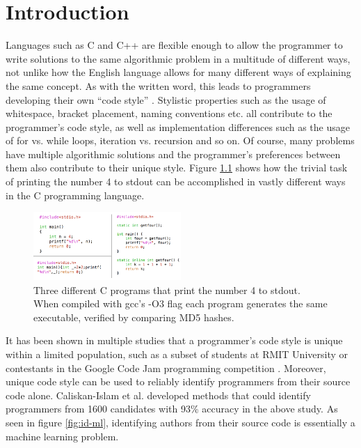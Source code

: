 \documentclass[a4paper,11pt]{kth-mag}
\begin{document}
\chapter{Introduction}
Languages such as C and C++ are flexible enough to allow the programmer to
write solutions to the same algorithmic problem in a multitude of different
ways, not unlike how the English language allows for many different ways of
explaining the same concept. As with the written word, this leads to
programmers developing their own ``code style''
\parencite{krsul1997authorship}. Stylistic properties such as the usage of
whitespace, bracket placement, naming conventions etc. all contribute to the
programmer's code style, as well as implementation differences such as the
usage of for vs. while loops, iteration vs. recursion and so on. Of course,
many problems have multiple algorithmic solutions and the programmer's
preferences between them also contribute to their unique style. Figure
\ref{fig:3x4} shows how the trivial task of printing the number 4 to stdout can
be accomplished in vastly different ways in the C programming language.


\begin{figure}[!htb]
    \centering
    \includegraphics[width=0.5\textwidth]{3x4}
    \caption{Three different C programs that print the number 4 to stdout. When
    compiled with gcc's -O3 flag each program generates the same executable,
    verified by comparing MD5 hashes.}
    \label{fig:3x4}
\end{figure}

It has been shown in multiple studies that a programmer's code style is unique
within a limited population, such as a subset of students at RMIT University
\parencite{burrows2009application} or contestants in the Google Code Jam
programming competition \parencite{caliskan2015anonymizing}. Moreover, unique
code style can be used to reliably identify programmers from their source code
alone.  Caliskan-Islam et al. developed methods that could identify programmers
from 1600 candidates with 93\% accuracy in the above study. As seen in figure
\ref{fig:id-ml}, identifying authors from their source code is essentially a
machine learning problem.
\end{document}

